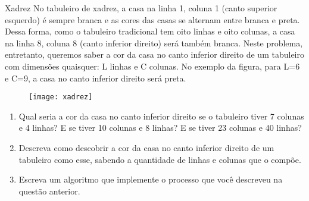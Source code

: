 \begin{task}{Xadrez}
No tabuleiro de xadrez, a casa na linha 1, coluna 1 (canto superior esquerdo) é sempre branca e as cores das casas se alternam entre branca e preta. Dessa forma, como o tabuleiro tradicional tem oito linhas e oito colunas, a casa na linha 8, coluna 8 (canto inferior direito) será também branca. Neste problema, entretanto, queremos saber a cor da casa no canto inferior direito de um tabuleiro com dimensões quaisquer: L linhas e C colunas. No exemplo da figura, para L=6 e C=9, a casa no canto inferior direito será preta.

\begin{figure}[H]
\centering

\texttt{[image: xadrez]}
\end{figure}

\begin{enumerate}
\item Qual seria a cor da casa no canto inferior direito se o tabuleiro tiver 7 colunas e 4 linhas? E se tiver 10 colunas e 8 linhas? E se tiver 23 colunas e 40 linhas?

\item Descreva como descobrir a cor da casa no canto inferior direito de um tabuleiro como esse, sabendo a quantidade de linhas e colunas que o compõe.

\item Escreva um algoritmo que implemente o processo que você descreveu na questão anterior.
\end{enumerate}
\end{task}

\newpage

